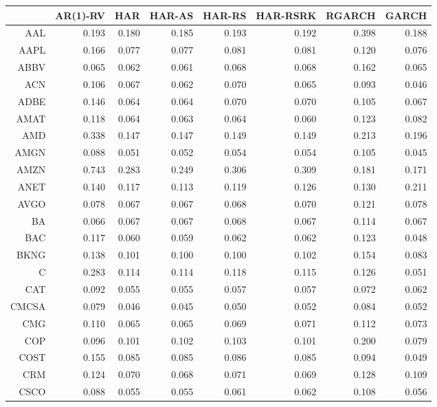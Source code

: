 \begin{table}[ht]
\centering
\begin{tabular}{rrrrrrrr}
  \hline
 & AR(1)-RV & HAR & HAR-AS & HAR-RS & HAR-RSRK & RGARCH & GARCH \\ 
  \hline
AAL & 0.193 & 0.180 & 0.185 & 0.193 & 0.192 & 0.398 & 0.188 \\ 
  AAPL & 0.166 & 0.077 & 0.077 & 0.081 & 0.081 & 0.120 & 0.076 \\ 
  ABBV & 0.065 & 0.062 & 0.061 & 0.068 & 0.068 & 0.162 & 0.065 \\ 
  ACN & 0.106 & 0.067 & 0.062 & 0.070 & 0.065 & 0.093 & 0.046 \\ 
  ADBE & 0.146 & 0.064 & 0.064 & 0.070 & 0.070 & 0.105 & 0.067 \\ 
  AMAT & 0.118 & 0.064 & 0.063 & 0.064 & 0.060 & 0.123 & 0.082 \\ 
  AMD & 0.338 & 0.147 & 0.147 & 0.149 & 0.149 & 0.213 & 0.196 \\ 
  AMGN & 0.088 & 0.051 & 0.052 & 0.054 & 0.054 & 0.105 & 0.045 \\ 
  AMZN & 0.743 & 0.283 & 0.249 & 0.306 & 0.309 & 0.181 & 0.171 \\ 
  ANET & 0.140 & 0.117 & 0.113 & 0.119 & 0.126 & 0.130 & 0.211 \\ 
  AVGO & 0.078 & 0.067 & 0.067 & 0.068 & 0.070 & 0.121 & 0.078 \\ 
  BA & 0.066 & 0.067 & 0.067 & 0.068 & 0.067 & 0.114 & 0.067 \\ 
  BAC & 0.117 & 0.060 & 0.059 & 0.062 & 0.062 & 0.123 & 0.048 \\ 
  BKNG & 0.138 & 0.101 & 0.100 & 0.100 & 0.102 & 0.154 & 0.083 \\ 
  C & 0.283 & 0.114 & 0.114 & 0.118 & 0.115 & 0.126 & 0.051 \\ 
  CAT & 0.092 & 0.055 & 0.055 & 0.057 & 0.057 & 0.072 & 0.062 \\ 
  CMCSA & 0.079 & 0.046 & 0.045 & 0.050 & 0.052 & 0.084 & 0.052 \\ 
  CMG & 0.110 & 0.065 & 0.065 & 0.069 & 0.071 & 0.112 & 0.073 \\ 
  COP & 0.096 & 0.101 & 0.102 & 0.103 & 0.101 & 0.200 & 0.079 \\ 
  COST & 0.155 & 0.085 & 0.085 & 0.086 & 0.085 & 0.094 & 0.049 \\ 
  CRM & 0.124 & 0.070 & 0.068 & 0.071 & 0.069 & 0.128 & 0.109 \\ 
  CSCO & 0.088 & 0.055 & 0.055 & 0.061 & 0.062 & 0.108 & 0.056 \\ 

\end{tabular}
\end{table}
